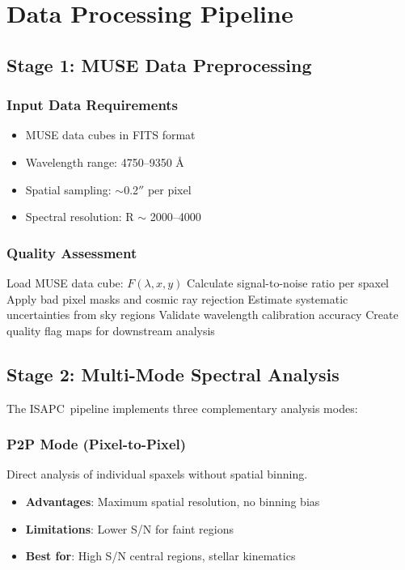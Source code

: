 \documentclass[12pt,a4paper]{article}
\newcommand{\ISAPC}{\textsc{ISAPC}}
\begin{document}
\section{Data Processing Pipeline}

\subsection{Stage 1: MUSE Data Preprocessing}

\subsubsection{Input Data Requirements}
\begin{itemize}
    \item MUSE data cubes in FITS format
    \item Wavelength range: 4750--9350 \AA
    \item Spatial sampling: $\sim$0.2$''$ per pixel
    \item Spectral resolution: R $\sim$ 2000--4000
\end{itemize}

\subsubsection{Quality Assessment}
\begin{algorithm}
\caption{Data Quality Control}
\begin{algorithmic}[1]
\STATE Load MUSE data cube: $F(\lambda, x, y)$
\STATE Calculate signal-to-noise ratio per spaxel
\STATE Apply bad pixel masks and cosmic ray rejection
\STATE Estimate systematic uncertainties from sky regions
\STATE Validate wavelength calibration accuracy
\STATE Create quality flag maps for downstream analysis
\end{algorithmic}
\end{algorithm}

\subsection{Stage 2: Multi-Mode Spectral Analysis}

The \ISAPC\ pipeline implements three complementary analysis modes:

\subsubsection{P2P Mode (Pixel-to-Pixel)}
Direct analysis of individual spaxels without spatial binning.
\begin{itemize}
    \item \textbf{Advantages}: Maximum spatial resolution, no binning bias
    \item \textbf{Limitations}: Lower S/N for faint regions
    \item \textbf{Best for}: High S/N central regions, stellar kinematics
\end{itemize}
\end{document}
